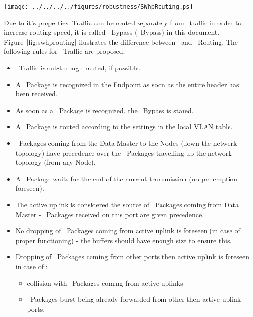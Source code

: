 \begin{center}
	\texttt{[image: ../../../../figures/robustness/SWhpRouting.ps]}
	\label{fig:swhprouting}
\end{center}

Due to it's properties, \HP Traffic can be routed separately from \SP\ traffic
in order to increase routing speed, it is called \HighPriority\ Bypass (\HP\
Bypass) in this document. Figure~\ref{fig:swhprouting} ilustrates the difference
between
\SP\ and \HP\ Routing. The following rules for \HP\ Traffic are proposed:
\begin{itemize}
  \item \HP\ Traffic is cut-through routed, if possible.
  \item A \HP\ Package is recognized in the Endpoint as soon as the entire
header has been received.
  \item As soon as a \HP\ Package is recognized, the \HP\ Bypass is stared.
  \item A \HP\ Package is routed according to the settings in the local VLAN
table.
  \item \HP\ Packages coming from the Data Master to the Nodes (down the network
topology) have precedence over the \HP\ Packages travelling up the network
topology (from any Node).
  \item A \HP\ Package waits for the end of the current transmission (no
pre-emption foreseen). 
  \item The active uplink is considered the source of \HP\ Packages coming from
Data Master - \HP\ Packages received on this port are given precedence.
  \item No dropping of \HP\ Packages coming from active uplink is foreseen (in
case of proper functioning) - the buffers should have enough size to ensure
this.
  \item Dropping of \HP\ Packages coming from other ports then active
uplink is foreseen in case of :
  \begin{itemize}
    \item collision with \HP\ Packages coming from active uplinks 
    \item \HP\ Packages burst being already forwarded from other then active
uplink ports.
  \end{itemize}

\end{itemize}


